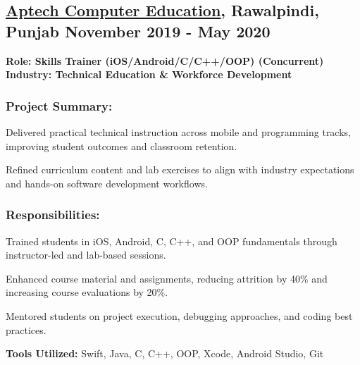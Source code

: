 \subsection{\textbf{\href{https://aptech-education.com.pk/}{Aptech Computer Education}, Rawalpindi, Punjab} \hfill November 2019 - May 2020}
\noindent\textbf{Role: Skills Trainer (iOS/Android/C/C++/OOP) (Concurrent)}\\
\noindent\textbf{Industry: Technical Education \& Workforce Development}

\subsubsection*{\textbf{Project Summary:}}
\begin{zitemize}
\item Delivered practical technical instruction across mobile and programming tracks, improving student outcomes and classroom retention.
\item Refined curriculum content and lab exercises to align with industry expectations and hands-on software development workflows.
\end{zitemize}

\subsubsection*{\textbf{Responsibilities:}}
\begin{zitemize}
\item Trained students in iOS, Android, C, C++, and OOP fundamentals through instructor-led and lab-based sessions.
\item Enhanced course material and assignments, reducing attrition by 40\% and increasing course evaluations by 20\%.
\item Mentored students on project execution, debugging approaches, and coding best practices.
\end{zitemize}

\noindent\textbf{Tools Utilized:} Swift, Java, C, C++, OOP, Xcode, Android Studio, Git